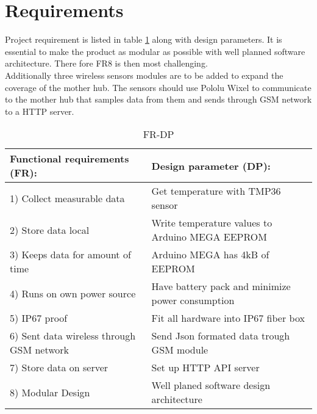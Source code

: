 \section{Requirements}\label{requirements}
Project requirement is listed in table \ref{tbl:FRDP} along with design parameters.
It is essential to make the product as modular as possible with well planned software architecture. There fore FR8 is then most challenging. \\
Additionally three wireless sensors modules are to be added to expand the coverage of the mother hub.  The sensors should use Pololu Wixel\cite{wixel} to communicate to the mother hub that samples data from them and sends through GSM network to a HTTP server.

\begin{table}[H]
	\caption{FR-DP}
	\label{tbl:FRDP}
\begin{tabular}{|p{8cm}|p{8cm}|}
		\hline \textbf{Functional requirements (FR):} & \textbf{Design parameter (DP):} \\ 
		\hline 1) Collect measurable data &   Get temperature with TMP36\cite{Devices2010} sensor\\
		\hline 2) Store data local &   Write temperature values to Arduino MEGA EEPROM \\
		\hline 3) Keeps data for amount of time &  Arduino MEGA \cite{arduinoMega} has 4kB of EEPROM \\
		\hline 4) Runs on own power source & Have battery pack and minimize power consumption \\ 
		\hline 5) IP67 proof &   Fit all hardware into IP67 fiber box\\
		\hline 6) Sent data wireless through GSM network & Send Json formated data trough GSM module \\ 
		\hline 7) Store data on server & Set up HTTP API server \\ 
		\hline 8) Modular Design & Well planed software design architecture \\ 
		\hline
	\end{tabular}
\end{table}
